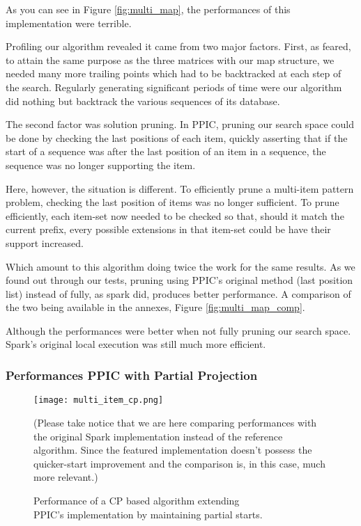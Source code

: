 \documentclass{eplmastersthesis}
\begin{document}
As you can see in Figure \ref{fig:multi_map}, the performances of this implementation were terrible. \newline

Profiling our algorithm revealed it came from two major factors. First, as feared, to attain the same purpose as the three matrices with our map structure, we needed many more trailing points which had to be backtracked at each step of the search. Regularly generating significant periods of time were our algorithm did nothing but backtrack the various sequences of its database. \newline

The second factor was solution pruning. In PPIC, pruning our search space could be done by checking the last positions of each item, quickly asserting that if the start of a sequence was after the last position of an item in a sequence, the sequence was no longer supporting the item. \newline

Here, however, the situation is different. To efficiently prune a multi-item pattern problem, checking the last position of items was no longer sufficient. To prune efficiently, each item-set now needed to be checked so that, should it match the current prefix, every possible extensions in that item-set could be have their support increased. \newline

Which amount to this algorithm doing twice the work for the same results. As we found out through our tests, pruning using PPIC's original method (last position list) instead of fully, as spark did, produces better performance. A comparison of the two being available in the annexes, Figure \ref{fig:multi_map_comp}. \newline

Although the performances were better when not fully pruning our search space. Spark's original local execution was still much more efficient.

\subsubsection{Performances PPIC with Partial Projection}

\begin{figure}[h]
  \centering
  \texttt{[image: multi\_item\_cp.png]}
  \caption[PPIC with partial starts]{
  		Performance of a CP based algorithm extending \\
  		PPIC's implementation by maintaining partial starts.
  	\endtabular
  }
  \label{fig:multi_array}
  (Please take notice that we are here comparing performances with the original Spark implementation instead of the reference algorithm. Since the featured implementation doesn't possess the quicker-start improvement and the comparison is, in this case, much more relevant.)
\end{figure}
\end{document}
